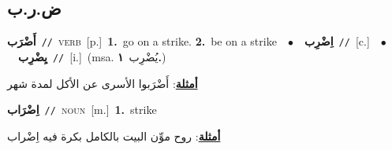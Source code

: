 \documentclass[10pt,a4paper,twoside]{article} %
\begin{document}
\begin{multicols}{2}
\vspace{-3mm}
\subsection*{\color{blue}\foreignlanguage{arabic}{ض.ر.ب}\color{blue}{}} 

{\setlength\topsep{0pt}\textbf{\foreignlanguage{arabic}{أَضْرَب}}\ {\color{gray}\texttt{//}\color{black}}\ \textsc{verb}\ [p.]\ \textbf{1.}~go on a strike.  \textbf{2.}~be on a strike\ \ $\bullet$\ \ \setlength\topsep{0pt}\textbf{\foreignlanguage{arabic}{اِضْرِب}}\ {\color{gray}\texttt{//}\color{black}}\ [c.]\ \ $\bullet$\ \ \setlength\topsep{0pt}\textbf{\foreignlanguage{arabic}{يِضْرِب}}\ {\color{gray}\texttt{//}\color{black}}\ [i.]\ \color{gray}(msa. \foreignlanguage{arabic}{يُضْرِب}~\foreignlanguage{arabic}{\textbf{١.}})\color{black}\  \begin{flushright}\color{gray}\foreignlanguage{arabic}{\textbf{\underline{\foreignlanguage{arabic}{أمثلة}}}: أَضْرَبوا الأسرى عن الأكل لمدة شهر}\end{flushright}\color{black}} \vspace{2mm}

{\setlength\topsep{0pt}\textbf{\foreignlanguage{arabic}{اِضْرَاب}}\ {\color{gray}\texttt{//}\color{black}}\ \textsc{noun}\ [m.]\ \textbf{1.}~strike\  \begin{flushright}\color{gray}\foreignlanguage{arabic}{\textbf{\underline{\foreignlanguage{arabic}{أمثلة}}}: روح موِّن البيت بالكامل بكرة فيه اِضْراب}\end{flushright}\color{black}} \vspace{2mm}


\end{multicols}
\end{document}

